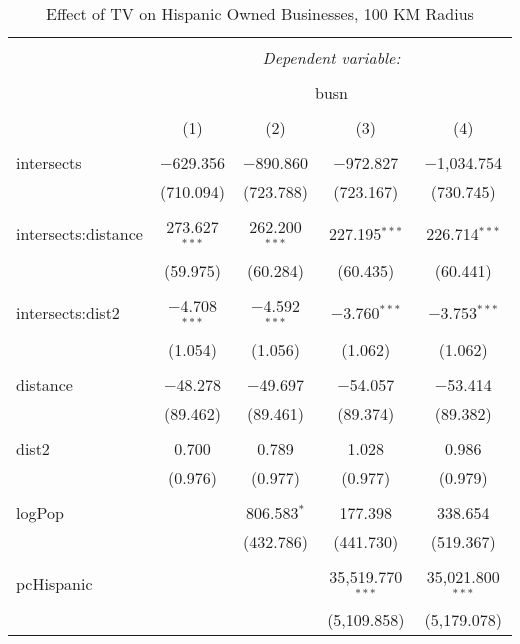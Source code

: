 
\begin{table}[!htbp] \centering 
  \caption{Effect of TV on Hispanic Owned Businesses, 100 KM Radius} 
  \label{} 
\begin{tabular}{@{\extracolsep{-5pt}}lcccc} 
\\[-1.8ex]\hline 
\hline \\[-1.8ex] 
 & \multicolumn{4}{c}{\textit{Dependent variable:}} \\ 
\cline{2-5} 
\\[-1.8ex] & \multicolumn{4}{c}{busn} \\ 
\\[-1.8ex] & (1) & (2) & (3) & (4)\\ 
\hline \\[-1.8ex] 
 intersects & $-$629.356 & $-$890.860 & $-$972.827 & $-$1,034.754 \\ 
  & (710.094) & (723.788) & (723.167) & (730.745) \\ 
  & & & & \\ 
 intersects:distance & 273.627$^{***}$ & 262.200$^{***}$ & 227.195$^{***}$ & 226.714$^{***}$ \\ 
  & (59.975) & (60.284) & (60.435) & (60.441) \\ 
  & & & & \\ 
 intersects:dist2 & $-$4.708$^{***}$ & $-$4.592$^{***}$ & $-$3.760$^{***}$ & $-$3.753$^{***}$ \\ 
  & (1.054) & (1.056) & (1.062) & (1.062) \\ 
  & & & & \\ 
 distance & $-$48.278 & $-$49.697 & $-$54.057 & $-$53.414 \\ 
  & (89.462) & (89.461) & (89.374) & (89.382) \\ 
  & & & & \\ 
 dist2 & 0.700 & 0.789 & 1.028 & 0.986 \\ 
  & (0.976) & (0.977) & (0.977) & (0.979) \\ 
  & & & & \\ 
 logPop &  & 806.583$^{*}$ & 177.398 & 338.654 \\ 
  &  & (432.786) & (441.730) & (519.367) \\ 
  & & & & \\ 
 pcHispanic &  &  & 35,519.770$^{***}$ & 35,021.800$^{***}$ \\ 
  &  &  & (5,109.858) & (5,179.078) \\ 

\end{tabular}
\end{table}
